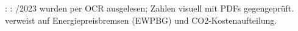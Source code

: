: \markdownRendererUlItemEnd 
{}: \markdownRendererUlItemEnd 
\markdownRendererUlEndTight \markdownRendererInterblockSeparator
{}
\markdownRendererSectionEnd \markdownRendererSectionBegin
{}\markdownRendererInterblockSeparator
{}\markdownRendererUlBeginTight
{}/2023 wurden per OCR ausgelesen; Zahlen visuell mit PDFs gegengeprüft.\markdownRendererUlItemEnd 
{} verweist auf Energiepreisbremsen (EWPBG) und CO2‑Kostenaufteilung.\markdownRendererUlItemEnd 
\markdownRendererUlEndTight 
\markdownRendererSectionEnd 
\markdownRendererSectionEnd \markdownRendererDocumentEnd
